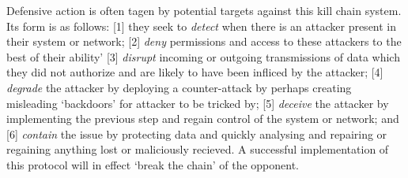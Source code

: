 \documentclass[11pt, english]{article}
\begin{document}
	Defensive action is often tagen by potential targets against this kill chain system. Its form is as follows: [1] they seek to \textit{detect} when there is an attacker present in their system or network; [2] \textit{deny} permissions and access to these attackers to the best of their ability' [3] \textit{disrupt} incoming or outgoing transmissions of data which they did not authorize and are likely to have been infliced by the attacker; [4] \textit{degrade} the attacker by deploying a counter-attack by perhaps creating misleading `backdoors' for attacker to be tricked by; [5] \textit{deceive} the attacker by implementing the previous step and regain control of the system or network; and [6] \textit{contain} the issue by protecting data and quickly analysing and repairing or regaining anything lost or maliciously recieved. A successful implementation of this protocol will in effect `break the chain' of the opponent.
\end{document}
